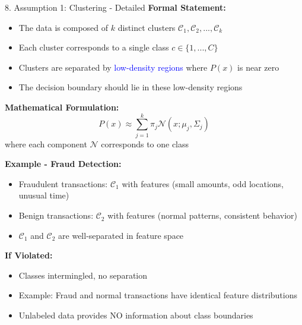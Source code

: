 \documentclass[8pt]{beamer}
\begin{document}
	\begin{frame}{8. Assumption 1: Clustering - Detailed}
		\fontsize{6.5}{7.5}\selectfont
		\textbf{Formal Statement:}
		\begin{itemize}
			\item The data is composed of $k$ distinct clusters $\mathcal{C}_1, \mathcal{C}_2, ..., \mathcal{C}_k$
			\item Each cluster corresponds to a single class $c \in \{1,...,C\}$
			\item Clusters are separated by \textcolor{blue}{low-density regions} where $P(x)$ is near zero
			\item The decision boundary should lie in these low-density regions
		\end{itemize}
		
		\textbf{Mathematical Formulation:}
		\[
		P(x) \approx \sum_{j=1}^k \pi_j \mathcal{N}(x; \mu_j, \Sigma_j)
		\]
		where each component $\mathcal{N}$ corresponds to one class
		
		\textbf{Example - Fraud Detection:}
		\begin{itemize}
			\item Fraudulent transactions: $\mathcal{C}_1$ with features (small amounts, odd locations, unusual time)
			\item Benign transactions: $\mathcal{C}_2$ with features (normal patterns, consistent behavior)
			\item $\mathcal{C}_1$ and $\mathcal{C}_2$ are well-separated in feature space
		\end{itemize}
		
		\textbf{If Violated:}
		\begin{itemize}
			\item Classes intermingled, no separation
			\item Example: Fraud and normal transactions have identical feature distributions
			\item Unlabeled data provides NO information about class boundaries
		\end{itemize}
	\end{frame}
	
\end{document}
